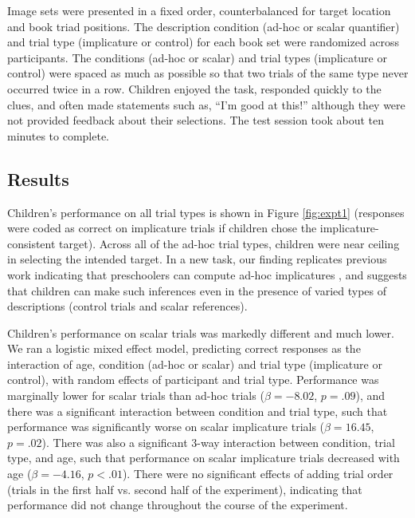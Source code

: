 \documentclass[10pt,letterpaper]{article}
\begin{document}
Image sets were presented in a fixed order, counterbalanced for target location and book triad positions.  The description condition (ad-hoc or scalar quantifier) and trial type (implicature or control) for each book set were randomized across participants. The conditions (ad-hoc or scalar) and trial types (implicature or control) were spaced as much as possible so that two trials of the same type never occurred twice in a row. Children enjoyed the task, responded quickly to the clues, and often made statements such as, ``I'm good at this!'' although they were not provided feedback about their selections. The test session took about ten minutes to complete.

\subsection{Results}

Children's performance on all trial types is shown in Figure \ref{fig:expt1} (responses were coded as correct on implicature trials if children chose the implicature-consistent target). Across all of the ad-hoc trial types, children were near ceiling in selecting the intended target. In a new task, our finding replicates previous work indicating that preschoolers can compute ad-hoc implicatures \cite{stiller2014}, and suggests that children can make such inferences even in the presence of varied types of descriptions (control trials and scalar references). 

Children's performance on scalar trials was markedly different and much lower. We ran a logistic mixed effect model, predicting correct responses as the interaction of age, condition (ad-hoc or scalar) and trial type (implicature or control), with random effects of participant and trial type. Performance was marginally lower for scalar trials than ad-hoc trials ($\beta = -8.02$, $p =.09$), and there was a significant interaction between condition and trial type, such that performance was significantly worse on scalar implicature trials ($\beta = 16.45$, $p = .02$).  There was also a significant 3-way interaction between condition, trial type, and age, such that performance on scalar implicature trials decreased with age ($\beta = -4.16$, $p < .01$). There were no significant effects of adding trial order (trials in the first half vs. second half of the experiment), indicating that performance did not change throughout the course of the experiment.
\end{document}

